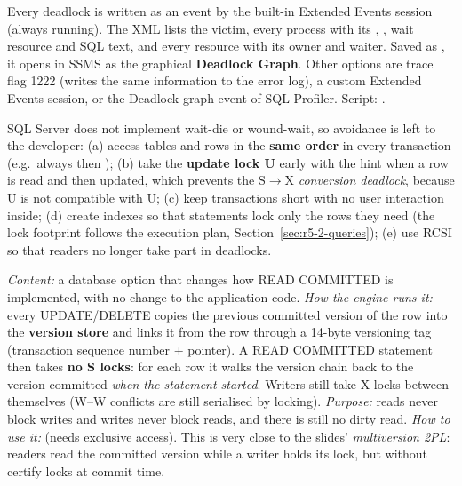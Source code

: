 Every deadlock is written as an  event by the built-in Extended Events session \textbf{} (always running). The XML lists the victim, every process with its , , wait resource and SQL text, and every resource with its owner and waiter. Saved as , it opens in SSMS as the graphical \textbf{Deadlock Graph}. Other options are trace flag 1222 (writes the same information to the error log), a custom Extended Events session, or the Deadlock graph event of SQL Profiler. Script: .

SQL Server does not implement wait-die or wound-wait, so avoidance is left to the developer: (a) access tables and rows in the \textbf{same order} in every transaction (e.g.\ always  then ); (b) take the \textbf{update lock U} early with the  hint when a row is read and then updated, which prevents the S$\rightarrow$X \emph{conversion deadlock}, because U is not compatible with U; (c) keep transactions short with no user interaction inside; (d) create indexes so that statements lock only the rows they need (the lock footprint follows the execution plan, Section~\ref{sec:r5-2-queries}); (e) use RCSI so that readers no longer take part in deadlocks.

\emph{Content:} a database option that changes how READ COMMITTED is implemented, with no change to the application code. \emph{How the engine runs it:} every UPDATE/DELETE copies the previous committed version of the row into the \textbf{version store} and links it from the row through a 14-byte versioning tag (transaction sequence number + pointer). A READ COMMITTED statement then takes \textbf{no S locks}: for each row it walks the version chain back to the version committed \emph{when the statement started}. Writers still take X locks between themselves (W--W conflicts are still serialised by locking). \emph{Purpose:} reads never block writes and writes never block reads, and there is still no dirty read. \emph{How to use it:}  (needs exclusive access). This is very close to the slides' \emph{multiversion 2PL}: readers read the committed version while a writer holds its lock, but without certify locks at commit time.

